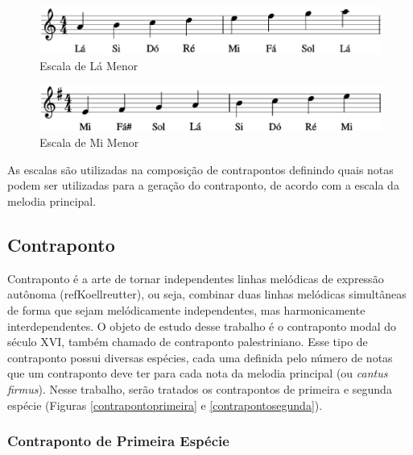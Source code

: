         \begin{figure}[htb]
          \centering
          \includegraphics[scale=0.6]{figuras/escalalamenor.eps}
          \caption{Escala de Lá Menor}
          \label{escalalamenor}
        \end{figure}

        \begin{figure}[htb]
          \centering
          \includegraphics[scale=0.45]{figuras/escalamimenor.eps}
          \caption{Escala de Mi Menor}
          \label{escalamimenor}
        \end{figure}

        As escalas são utilizadas na composição de contrapontos definindo quais notas podem ser utilizadas para a geração do contraponto, de acordo com a escala da melodia principal.

    \subsection[Contraponto]{Contraponto}

      Contraponto é a arte de tornar independentes linhas melódicas de expressão autônoma (refKoellreutter), ou seja, combinar duas linhas melódicas simultâneas de forma que sejam melódicamente independentes, mas harmonicamente interdependentes. O objeto de estudo desse trabalho é o contraponto modal do século XVI, também chamado de contraponto palestriniano. Esse tipo de contraponto possui diversas espécies, cada uma definida pelo número de notas que um contraponto deve ter para cada nota da melodia principal (ou \textit{cantus firmus}). Nesse trabalho, serão tratados os contrapontos de primeira e segunda espécie (Figuras \ref{contrapontoprimeira} e \ref{contrapontosegunda}).

      \subsubsection[Contraponto de Primeira Espécie]{Contraponto de Primeira Espécie}

